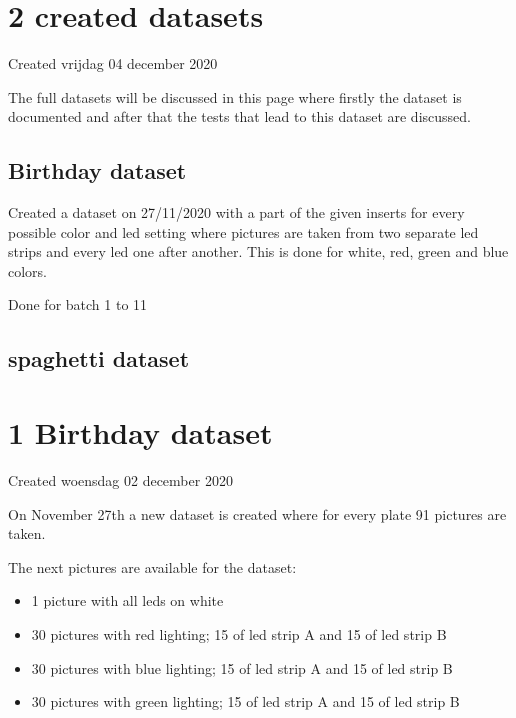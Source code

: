 \documentclass{article}
\begin{document}
		\section{2 created datasets}

Created vrijdag 04 december 2020



The full datasets will be discussed in this page where firstly the dataset is documented and after that the tests that lead to this dataset are discussed.



\subsection{Birthday dataset}

Created a dataset on 27/11/2020 with a part of the given inserts for every possible color and led setting where pictures are taken from two separate led strips and every led one after another. This is done for white, red, green and blue colors. 

Done for batch 1 to 11





\subsection{spaghetti dataset}


		\section{1 Birthday dataset}

Created woensdag 02 december 2020





On November 27th a new dataset is created where for every plate 91 pictures are taken. 



The next pictures are available for the dataset:

\begin{itemize}
\item 1 picture with all leds on white
\item 30 pictures with red lighting; 15 of led strip A and 15 of led strip B
\item 30 pictures with blue lighting; 15 of led strip A and 15 of led strip B
\item 30 pictures with green lighting; 15 of led strip A and 15 of led strip B
\end{itemize}
\end{document}
